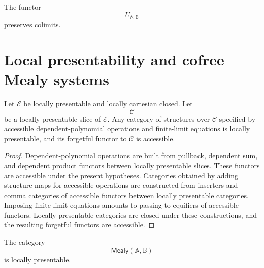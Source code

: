 \begin{corollary}
\label{cor:mealy-forgetful-preserves-colimits}
The functor
\[
U_{\mathbb A,\mathbb B}
\]
preserves colimits.
\end{corollary}

\section{Local presentability and cofree Mealy systems}
\label{sec:cofree-mealy-systems}

\begin{lemma}
\label{lem:accessible-dependent-polynomial-structures}
Let \(\mathcal E\) be locally presentable and locally cartesian closed. Let
\[
\mathcal C
\]
be a locally presentable slice of \(\mathcal E\). Any category of structures
over \(\mathcal C\) specified by accessible dependent-polynomial operations
and finite-limit equations is locally presentable, and its forgetful functor
to \(\mathcal C\) is accessible.
\end{lemma}

\begin{proof}
Dependent-polynomial operations are built from pullback, dependent sum, and
dependent product functors between locally presentable slices. These functors
are accessible under the present hypotheses. Categories obtained by adding
structure maps for accessible operations are constructed from inserters and
comma categories of accessible functors between locally presentable
categories. Imposing finite-limit equations amounts to passing to equifiers
of accessible functors. Locally presentable categories are closed under these
constructions, and the resulting forgetful functors are accessible.
\end{proof}

\begin{proposition}
\label{prop:mealy-category-locally-presentable}
The category
\[
\mathsf{Mealy}(\mathbb A,\mathbb B)
\]
is locally presentable.
\end{proposition}


